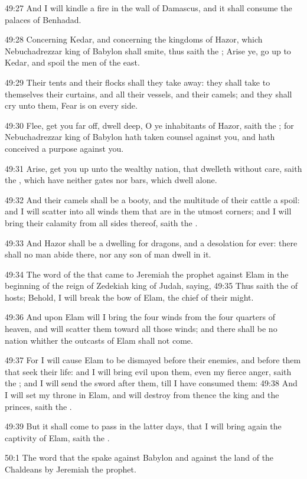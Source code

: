 49:27 And I will kindle a fire in the wall of Damascus, and it shall consume the palaces of Benhadad.

49:28 Concerning Kedar, and concerning the kingdoms of Hazor, which Nebuchadrezzar king of Babylon shall smite, thus saith the \LORD; Arise ye, go up to Kedar, and spoil the men of the east.

49:29 Their tents and their flocks shall they take away: they shall take to themselves their curtains, and all their vessels, and their camels; and they shall cry unto them, Fear is on every side.

49:30 Flee, get you far off, dwell deep, O ye inhabitants of Hazor, saith the \LORD; for Nebuchadrezzar king of Babylon hath taken counsel against you, and hath conceived a purpose against you.

49:31 Arise, get you up unto the wealthy nation, that dwelleth without care, saith the \LORD, which have neither gates nor bars, which dwell alone.

49:32 And their camels shall be a booty, and the multitude of their cattle a spoil: and I will scatter into all winds them that are in the utmost corners; and I will bring their calamity from all sides thereof, saith the \LORD.

49:33 And Hazor shall be a dwelling for dragons, and a desolation for ever: there shall no man abide there, nor any son of man dwell in it.

49:34 The word of the \LORD that came to Jeremiah the prophet against Elam in the beginning of the reign of Zedekiah king of Judah, saying, 49:35 Thus saith the \LORD of hosts; Behold, I will break the bow of Elam, the chief of their might.

49:36 And upon Elam will I bring the four winds from the four quarters of heaven, and will scatter them toward all those winds; and there shall be no nation whither the outcasts of Elam shall not come.

49:37 For I will cause Elam to be dismayed before their enemies, and before them that seek their life: and I will bring evil upon them, even my fierce anger, saith the \LORD; and I will send the sword after them, till I have consumed them: 49:38 And I will set my throne in Elam, and will destroy from thence the king and the princes, saith the \LORD.

49:39 But it shall come to pass in the latter days, that I will bring again the captivity of Elam, saith the \LORD.

50:1 The word that the \LORD spake against Babylon and against the land of the Chaldeans by Jeremiah the prophet.

